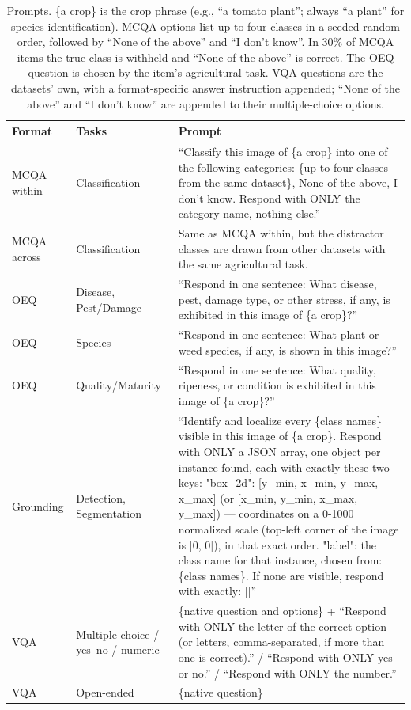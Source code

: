 \documentclass[10pt,letterpaper]{article}
\newcommand{\tablefont}{\footnotesize}
\begin{document}
\begin{table}[!tp]
\centering
\caption{Prompts. \{a crop\} is the crop phrase (e.g., ``a tomato plant''; always ``a plant'' for species identification). MCQA options list up to four classes in a seeded random order, followed by ``None of the above'' and ``I don't know''. In 30\% of MCQA items the true class is withheld and ``None of the above'' is correct. The OEQ question is chosen by the item's agricultural task. VQA questions are the datasets' own, with a format-specific answer instruction appended; ``None of the above'' and ``I don't know'' are appended to their multiple-choice options.}
\label{tab:prompts}
\renewcommand{\arraystretch}{1.3}
\tablefont
\begin{tabular}{p{2.0cm} p{2.8cm} p{10.4cm}}
\hline
\textbf{Format} & \textbf{Tasks} & \textbf{Prompt} \\
\hline
MCQA within & Classification & ``Classify this image of \{a crop\} into one of the following categories: \{up to four classes from the same dataset\}, None of the above, I don't know. Respond with ONLY the category name, nothing else.'' \\
\hline
MCQA across & Classification & Same as MCQA within, but the distractor classes are drawn from other datasets with the same agricultural task. \\
\hline
OEQ & Disease, Pest/Damage & ``Respond in one sentence: What disease, pest, damage type, or other stress, if any, is exhibited in this image of \{a crop\}?'' \\
\hline
OEQ & Species & ``Respond in one sentence: What plant or weed species, if any, is shown in this image?'' \\
\hline
OEQ & Quality/Maturity & ``Respond in one sentence: What quality, ripeness, or condition is exhibited in this image of \{a crop\}?'' \\
\hline
Grounding & Detection, Segmentation & ``Identify and localize every \{class names\} visible in this image of \{a crop\}. Respond with ONLY a JSON array, one object per instance found, each with exactly these two keys: "box\_2d": [y\_min, x\_min, y\_max, x\_max] (or [x\_min, y\_min, x\_max, y\_max]) --- coordinates on a 0-1000 normalized scale (top-left corner of the image is [0, 0]), in that exact order. "label": the class name for that instance, chosen from: \{class names\}. If none are visible, respond with exactly: []'' \\
\hline
VQA & Multiple choice / yes--no / numeric & \{native question and options\} + ``Respond with ONLY the letter of the correct option (or letters, comma-separated, if more than one is correct).'' / ``Respond with ONLY yes or no.'' / ``Respond with ONLY the number.'' \\
\hline
VQA & Open-ended & \{native question\} \\
\hline
\end{tabular}
\end{table}
\end{document}
